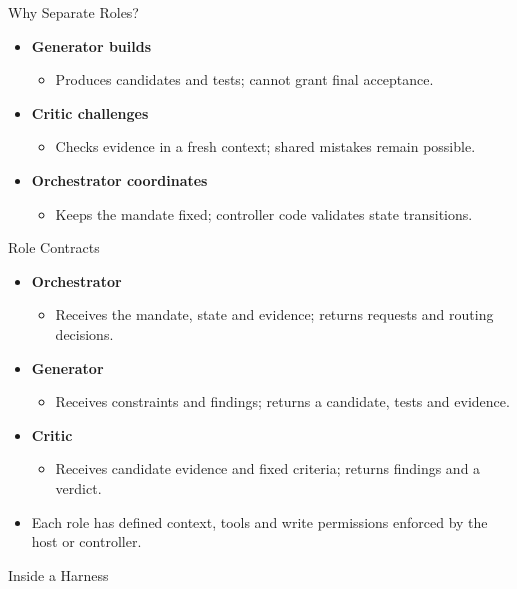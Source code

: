 \begin{frame}{Why Separate Roles?}
\begin{itemize}
\item \textbf{Generator builds}
\begin{itemize}
\item Produces candidates and tests; cannot grant final acceptance.
\end{itemize}
\item \textbf{Critic challenges}
\begin{itemize}
\item Checks evidence in a fresh context; shared mistakes remain possible.
\end{itemize}
\item \textbf{Orchestrator coordinates}
\begin{itemize}
\item Keeps the mandate fixed; controller code validates state transitions.
\end{itemize}
\end{itemize}
\end{frame}

\begin{frame}{Role Contracts}
\begin{itemize}
\item \textbf{Orchestrator}
\begin{itemize}
\item Receives the mandate, state and evidence; returns requests and routing decisions.
\end{itemize}
\item \textbf{Generator}
\begin{itemize}
\item Receives constraints and findings; returns a candidate, tests and evidence.
\end{itemize}
\item \textbf{Critic}
\begin{itemize}
\item Receives candidate evidence and fixed criteria; returns findings and a verdict.
\end{itemize}
\item Each role has defined context, tools and write permissions enforced by the host or controller.
\end{itemize}
\end{frame}

\begin{frame}{Inside a Harness}
\begin{center}
\resizebox{.92\textwidth}{!}{}
\end{center}
\end{frame}

